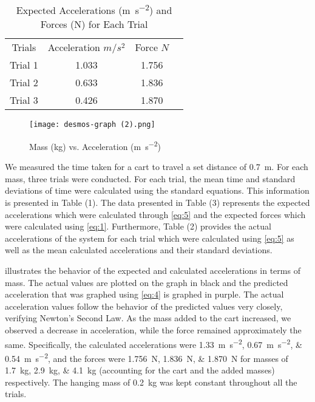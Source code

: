 \documentclass[reprint,amsmath,amssymb.aps]{revtex4-2}
\begin{document}
\begin{table} %
\centering
\begin{tabular}{cccc}
  Trials & Acceleration $m/s^2$ & Force $N$ \\ 
  Trial 1 & 1.033 & 1.756\\ 
  Trial 2 & 0.633 & 1.836 \\ 
  Trial 3 & 0.426 & 1.870 \\ 
\end{tabular}
\caption{ Expected Accelerations (\unit{\meter\per\second\squared}) and Forces (\unit{\newton}) for Each Trial}
\label{Accelerations for Each Trial} 
\end{table}

\begin{figure} %
\centering
\texttt{[image: desmos-graph (2).png]}
\caption{Mass (\unit{\kilo\gram}) vs. Acceleration (\unit{\meter\per\second\squared})}
\label{fig:graph of acceleration}
\end{figure}


We measured the time taken for a cart to travel a set distance of \qty{0.7}{\meter}. For each mass, three trials were conducted. For each trial, the mean time and standard deviations of time were calculated using the standard equations. This information is presented in Table (1). The data presented in Table (3) represents the expected accelerations which were calculated through  \cref{eq:5} and the expected forces which were calculated using \cref{eq:1}. Furthermore,  Table (2) provides the actual accelerations of the system for each trial which were calculated using \cref{eq:5} as well as the mean calculated accelerations and their standard deviations.

 illustrates the behavior of the expected and calculated accelerations in terms of mass. The actual values are plotted on the graph in black and the predicted acceleration that was graphed using \cref{eq:4} is graphed in purple. The actual acceleration values follow the behavior of the predicted values very closely, verifying Newton's Second Law. As the mass added to the cart increased, we observed a decrease in acceleration, while the force remained approximately the same. Specifically, the calculated accelerations were \qtylist{1.33;0.67;0.54}{\meter\per\second\squared}, and the forces were \qtylist{1.756;1.836;1.870}{\newton} for masses of \qtylist{1.7;2.9;4.1}{\kilo\gram} (accounting for the cart and the added masses) respectively. The hanging mass of \qty{0.2}{\kilo\gram} was kept constant throughout all the trials. 
\end{document}
